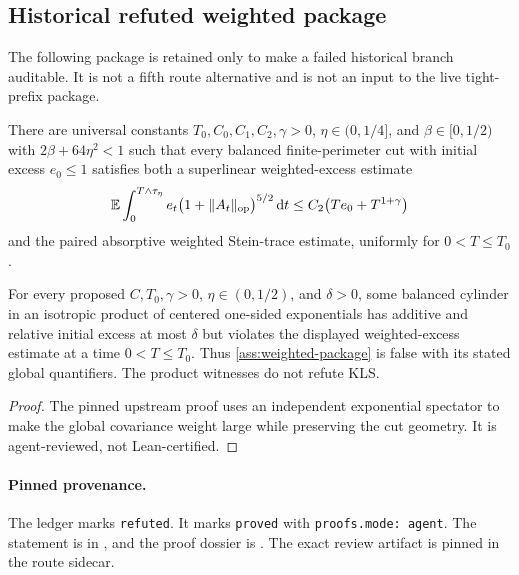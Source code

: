 \subsection{Historical refuted weighted package}
\label{route:eldan-weighted-package}

The following package is retained only to make a failed historical branch auditable.  It is not a
fifth route alternative and is not an input to the live tight-prefix package.

\begin{assumption}
  \label{ass:weighted-package}
  There are universal constants $T_0,C_0,C_1,C_2,\gamma>0$,
  $\eta\in(0,1/4]$, and $\beta\in[0,1/2)$ with $2\beta+64\eta^2<1$ such that every balanced
  finite-perimeter cut with initial excess $e_0\le1$ satisfies both a superlinear weighted-excess
  estimate
  \[
    \mathbb{E}\int_0^{T\wedge\tau_\eta}
      e_t\bigl(1+\lVert A_t\rVert_{\mathrm{op}}\bigr)^{5/2}\,\mathrm d t
      \le C_2\bigl(Te_0+T^{1+\gamma}\bigr)
  \]
  and the paired absorptive weighted Stein-trace estimate, uniformly for $0<T\le T_0$.
\end{assumption}

\begin{proposition}
  \label{prop:weighted-spectator-obstruction}
  For every proposed $C,T_0,\gamma>0$, $\eta\in(0,1/2)$, and $\delta>0$, some balanced cylinder
  in an isotropic product of centered one-sided exponentials has additive and relative initial
  excess at most $\delta$ but violates the displayed weighted-excess estimate at a time
  $0<T\le T_0$.  Thus \cref{ass:weighted-package} is false with its stated global quantifiers.
  The product witnesses do not refute KLS.
\end{proposition}
\begin{proof}
  The pinned upstream proof uses an independent exponential spectator to make the global
  covariance weight large while preserving the cut geometry.  It is agent-reviewed, not
  Lean-certified.
\end{proof}

\paragraph{Pinned provenance.}
The ledger marks  \texttt{refuted}.  It marks
 \texttt{proved} with \texttt{proofs.mode: agent}.  The
statement is in , and the proof dossier is
.  The exact review artifact is pinned in
the route sidecar.

